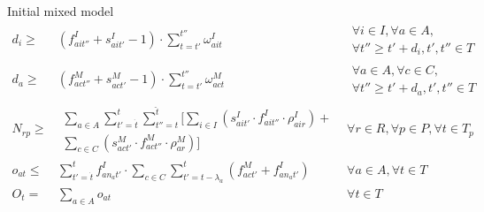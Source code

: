 \documentclass{beamer}
\begin{document}
\begin{frame}{Initial mixed model}
{\begin{align}
d_i \geq& (f^I_{ait''} + s^I_{ait'} - 1) \cdot \sum_{t = t'}^{t''} \omega^I_{ait} 				& 	\begin{aligned} \forall i \in I, \forall a \in A, \\
																	\forall t'' \geq t' + d_i, t', t'' \in T	\end{aligned}\\
d_a \geq& (f^M_{act''} + s^M_{act'} - 1) \cdot \sum_{t = t'}^{t''} \omega^M_{act} 				& 	\begin{aligned} \forall a \in A, \forall c \in C, \\
																	\forall t'' \geq t' + d_a, t', t'' \in T	\end{aligned}\\
N_{rp} \geq& \begin{aligned}\sum_{a\in A} \sum_{t' = \dot{t}}^t \sum_{t'' = t}^{\hat{t}} [ \sum_{i\in I} (s^I_{ait'} \cdot f^I_{ait''} \cdot \rho_{air}^I) + \\ \sum_{c\in C} (s^M_{act'} \cdot f^M_{act''} \cdot \rho_{ar}^M) ] \end{aligned}	& 	\forall r \in R, \forall p \in P, \forall t \in T_p 	\\
o_{at} \leq& \sum_{t' = \dot{t}}^{t} f^I_{an_at'} \cdot \sum_{c \in C} \sum_{t' = t - \lambda_a}^t (f^M_{act'} + f^I_{an_at'})	&	\forall a \in A, \forall t \in T \\
O_t =& \sum_{a \in A} o_{at}													&	\forall t \in T
\end{align} }

\end{frame}
\end{document}
